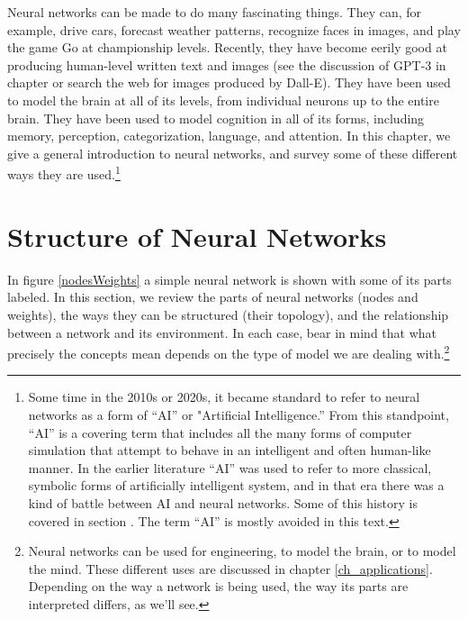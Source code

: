 Neural networks can be made to do many fascinating things. They can, for example, drive cars, forecast weather patterns, recognize faces in images, and play the game Go at championship levels. Recently, they have become eerily good at producing human-level written text and images (see the discussion of GPT-3 in chapter  or search the web for images produced by Dall-E). They have been used to model the brain at all of its levels, from individual neurons up to the entire brain. They have been used to model cognition in all of its forms, including memory, perception, categorization, language, and attention. In this chapter, we give a general introduction to neural networks, and survey some of these different ways they are used.\footnote{Some time in the 2010s or 2020s, it became standard to refer to neural networks as a form of ``AI'' or "Artificial Intelligence.''  From this standpoint, ``AI'' is a covering term that includes all the many forms of computer simulation that attempt to behave in an intelligent and often human-like manner.  In the earlier literature ``AI'' was used to refer to more classical, symbolic forms of artificially intelligent system, and in that era there was a kind of battle between AI and neural networks. Some of this history is covered in section .  The term ``AI'' is mostly avoided in this text.}

\section{Structure of Neural Networks}\label{structureNets}

In figure \ref{nodesWeights} a simple neural network is shown with some of its parts labeled. In this section, we review the parts of neural networks (nodes and weights), the ways they can be structured (their topology), and the relationship between a network and its environment. In each case, bear in mind that what precisely the concepts mean depends on the type of model we are dealing with.\footnote{Neural networks can be used for engineering, to model the brain, or to model the mind. These different uses are discussed in chapter \ref{ch_applications}. Depending on the way a network is being used, the way its parts are interpreted differs, as we'll see.} 

